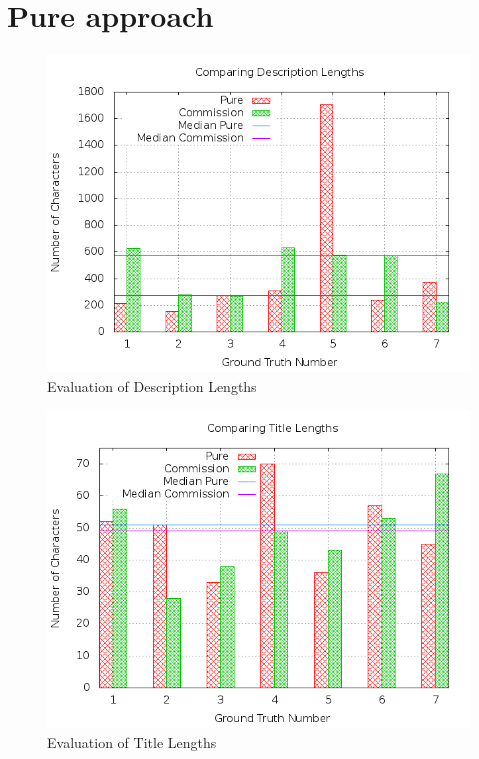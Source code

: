 \section{Pure approach}
\begin{figure}
\centering
\includegraphics[scale=0.55]{images/plots/crowdsourcing/plot_description_length.png}
\caption{Evaluation of Description Lengths}
\label{crowdsourcing_desc_length}
\end{figure}
\begin{figure}
\centering
\includegraphics[scale=0.55]{images/plots/crowdsourcing/plot_title_length.png}
\caption{Evaluation of Title Lengths}
\label{crowdsourcing_desc_length}
\end{figure}
